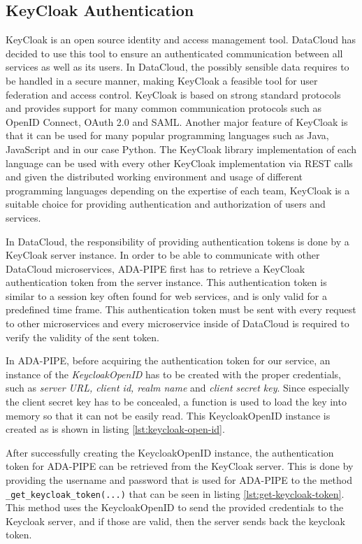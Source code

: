 \documentclass{article}
\begin{document}
        \subsection{KeyCloak Authentication}

            KeyCloak is an open source identity and access management tool.
            DataCloud has decided to use this tool to ensure an authenticated communication between all services as well as its users.
            In DataCloud, the possibly sensible data requires to be handled in a secure manner, making KeyCloak a feasible tool for user federation and access control. KeyCloak is based on strong standard protocols and provides support for many common communication protocols such as OpenID Connect, OAuth 2.0 and SAML.
            Another major feature of KeyCloak is that it can be used for many popular programming languages such as Java, JavaScript and in our case Python. The KeyCloak library implementation of each language can be used with every other KeyCloak implementation via REST calls and given the distributed working environment and usage of different programming languages depending on the expertise of each team, KeyCloak is a suitable choice for providing authentication and authorization of users and services.

            In DataCloud, the responsibility of providing authentication tokens is done by a KeyCloak server instance.
            In order to be able to communicate with other DataCloud microservices, ADA-PIPE first has to retrieve a KeyCloak authentication token from the server instance. This authentication token is similar to a session key often found for web services, and is only valid for a predefined time frame. This authentication token must be sent with every request to other microservices and every microservice inside of DataCloud is required to verify the validity of the sent token.

            In ADA-PIPE, before acquiring the authentication token for our service, an instance of the \emph{KeycloakOpenID} has to be created with the proper credentials, such as \emph{server URL, client id, realm name} and \emph{client secret key}. Since especially the client secret key has to be concealed, a function is used to load the key into memory so that it can not be easily read. This KeycloakOpenID instance is created as is shown in listing \ref{lst:keycloak-open-id}.
            
            
            After successfully creating the KeycloakOpenID instance, the authentication token for ADA-PIPE can be retrieved from the KeyCloak server. This is done by providing the username and password that is used for ADA-PIPE to the method \texttt{\_get\_keycloak\_token(...)} that can be seen in listing \ref{lst:get-keycloak-token}. This method uses the KeycloakOpenID to send the provided credentials to the Keycloak server, and if those are valid, then the server sends back the keycloak token.
            
\end{document}
